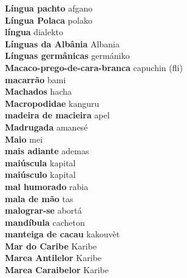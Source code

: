 \textbf{ Língua pachto  } afgano \\
\textbf{ Língua Polaca  } polako \\
\textbf{ língua  } dialekto \\
\textbf{ Línguas da Albânia  } Albania \\
\textbf{ Línguas germânicas  } germániko \\
\textbf{ Macaco-prego-de-cara-branca  } capuchin (fli) \\
\textbf{ macarrão  } bami \\
\textbf{ Machados  } hacha \\
\textbf{ Macropodidae  } kanguru \\
\textbf{ madeira de macieira  } apel \\
\textbf{ Madrugada  } amanesé \\
\textbf{ Maio  } mei \\
\textbf{ mais adiante  } ademas \\
\textbf{ maiúscula  } kapital \\
\textbf{ maiúsculo  } kapital \\
\textbf{ mal humorado  } rabia \\
\textbf{ mala de mão  } tas \\
\textbf{ malograr-se  } abortá \\
\textbf{ mandíbula  } cacheton \\
\textbf{ manteiga de cacau  } kakouvèt \\
\textbf{ Mar do Caribe  } Karibe \\
\textbf{ Marea Antilelor  } Karibe \\
\textbf{ Marea Caraibelor  } Karibe \\
